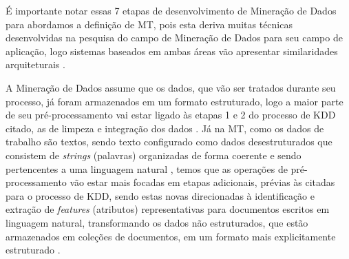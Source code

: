     
    É importante notar essas 7 etapas de desenvolvimento de Mineração de Dados para abordamos a definição de MT, pois esta deriva muitas técnicas desenvolvidas na pesquisa do campo de Mineração de Dados para seu campo de aplicação, logo sistemas baseados em ambas áreas vão apresentar similaridades arquiteturais \cite[p.~1]{Feldman:2006:TMH:1076381}. 
    
    
    
    A Mineração de Dados assume que os dados, que vão ser tratados durante seu processo, já foram armazenados em um formato estruturado, logo a maior parte de seu pré-processamento vai estar ligado às etapas 1 e 2 do processo de KDD citado, as de limpeza e integração dos dados \cite[p.~1]{Feldman:2006:TMH:1076381}. %
    Já na MT, como os dados de trabalho são textos, sendo texto configurado como dados desestruturados que consistem de \textit{strings} (palavras) organizadas de forma coerente e sendo pertencentes a uma linguagem natural \cite[p.~1]{Jo2018TMCIBDC}, temos que as operações de pré-processamento vão estar mais focadas em etapas adicionais, prévias às citadas para o processo de KDD, sendo estas novas direcionadas à identificação e extração de \textit{features} (atributos) representativas para documentos escritos em linguagem natural, transformando os dados não estruturados, que estão armazenados em coleções de documentos, em um formato mais explicitamente estruturado \cite[p.~1]{Feldman:2006:TMH:1076381}.
    
